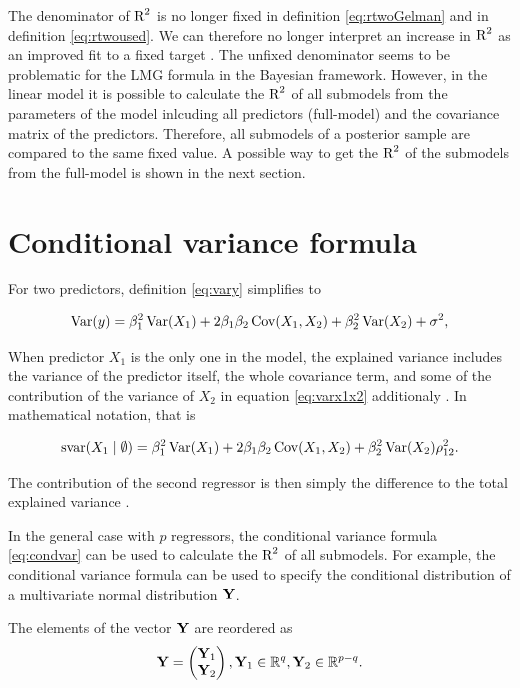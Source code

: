 \documentclass[11pt,a4paper,twoside]{book}\usepackage[]{graphicx}\usepackage[]{color}
\begin{document}
The denominator of $\text{R}^2$ is no longer fixed in definition \eqref{eq:rtwoGelman} and in definition \eqref{eq:rtwoused}. We can therefore no longer interpret an increase in $\text{R}^2$ as an improved fit to a fixed target \citep{Gelman2017}. The unfixed denominator seems to be problematic for the LMG formula in the Bayesian framework. However, in the linear model it is possible to calculate the $\text{R}^2$ of all submodels from the parameters of the model inlcuding all predictors (full-model) and the covariance matrix of the predictors. Therefore,  all submodels of a posterior sample are compared to the same fixed value. A possible way to get the $\text{R}^2$ of the submodels from the full-model is shown in the next section.

\section{Conditional variance formula}


For two predictors, definition \eqref{eq:vary} simplifies to

      \begin{align} 
        \operatorname{Var}(y) = \beta_{1}^2 \operatorname{Var}(X_{1}) + 2  \beta_{1}  \beta_{2} \operatorname{Cov}(X_{1}, X_{2}) + \beta_{2}^2 \operatorname{Var}(X_{2}) + \sigma^2, \label{eq:varx1x2} 
   \end{align}
 
 When predictor $X_{1}$ is the only one in the model, the explained variance includes the variance of the predictor itself, the whole covariance term, and some of the contribution of the variance of $X_{2}$ in equation \eqref{eq:varx1x2} additionaly . In mathematical notation, that is
 
      \begin{align} 
        \text{svar}({X_{1}} \mid \emptyset ) = \beta_{1}^2 \operatorname{Var}(X_{1}) + 2  \beta_{1}  \beta_{2} \operatorname{Cov}(X_{1}, X_{2}) + \beta_{2}^2 \operatorname{Var}(X_{2}) \rho_{12}^2 \text{.} \nonumber 
   \end{align}
   
The contribution of the second regressor is then simply the difference to the total explained variance \citep{Gromping2007}. 

In the general case with $p$ regressors, the conditional variance formula \eqref{eq:condvar} can be used to calculate the $\text{R}^2$ of all submodels. For example, the conditional variance formula can be used to specify the conditional distribution of a multivariate normal distribution ${\mathbf{Y}}$.

The elements of the vector ${\mathbf{Y}}$ are reordered as
\begin{align*}
\mathbf{Y} = \begin{pmatrix}
\mathbf{Y}_{1} \\ 
\mathbf{Y}_{2} \end{pmatrix}, \mathbf{Y}_{1} \in {\mathbb{R}}^q, \mathbf{Y}_{2} \in {\mathbb{R}}^{p-q} .
\end{align*}
\end{document}

